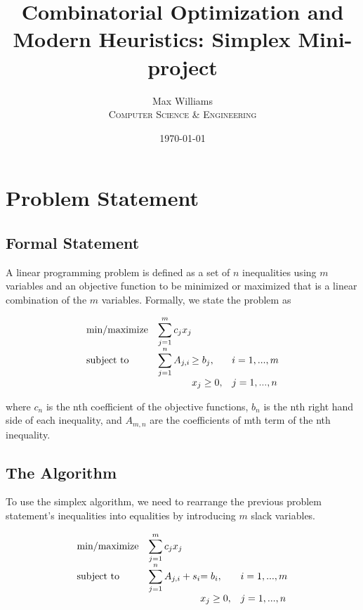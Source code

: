 \documentclass[11pt, a4paper]{article}
\title{Combinatorial Optimization and Modern Heuristics: Simplex Mini-project}
\author{
	Max Williams\\
    \textsc{Computer Science \& Engineering}\\
	}
\date{\today}
\begin{document}
\maketitle


\section{Problem Statement}

\subsection{Formal Statement}


A linear programming problem is defined as a set of $n$ inequalities using $m$ variables and an
objective function to be minimized or maximized that is a linear combination of the $m$ variables.
Formally, we state the problem as

\begin{equation*}
\begin{array}{ll@{}ll}
\text{min/maximize}  & \displaystyle\sum\limits_{j=1}^{m} c_{j}x_{j} &&\\
\text{subject to}& \displaystyle\sum\limits_{j=1}^{n}  A_{j,i} & \geq b_j,  &i=1 ,..., m\\
                 &                                                &x_{j} \geq 0, &j=1 ,..., n
\end{array}
\end{equation*}

where $c_n$ is the nth coefficient of the objective functions, $b_n$ is the nth right hand side of
each inequality, and $A_{m,n}$ are the coefficients of mth term of the nth inequality.

\subsection{The Algorithm}

To use the simplex algorithm, we need to rearrange the previous problem statement's inequalities
into equalities by introducing $m$ slack variables.

\begin{equation*}
\begin{array}{ll@{}ll}
\text{min/maximize}  & \displaystyle\sum\limits_{j=1}^{m} c_{j}x_{j} &&\\
\text{subject to}& \displaystyle\sum\limits_{j=1}^{n}  A_{j,i} + s_i &= b_i ,  &i=1 ,..., m\\
                 &                                                &x_{j} \geq 0, &j=1 ,..., n
\end{array}
\end{equation*}
\end{document}
